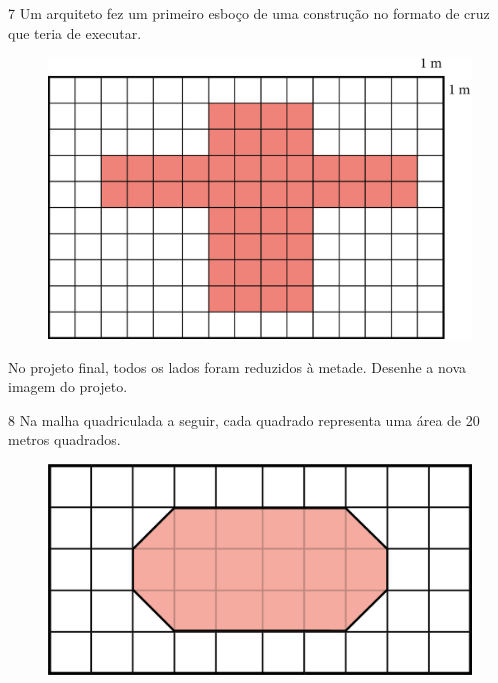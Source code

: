 
\num{7} Um arquiteto fez um primeiro esboço de uma construção no formato de cruz
que teria de executar.

\begin{figure}[htpb!]
\centering
\includegraphics[width=\textwidth]{media/image32.png}
\end{figure}


No projeto final, todos os lados foram reduzidos à metade. Desenhe a nova imagem do projeto.

\begin{mdframed}[linewidth=2pt,linecolor=salmao,roundcorner=2pt]
\vspace{7cm}
\end{mdframed}

\num{8} Na malha quadriculada a seguir, cada quadrado representa uma área de 20
metros quadrados.

\begin{figure}[htpb!]
\centering
\includegraphics[width=\textwidth]{media/image33.png}
\end{figure}

